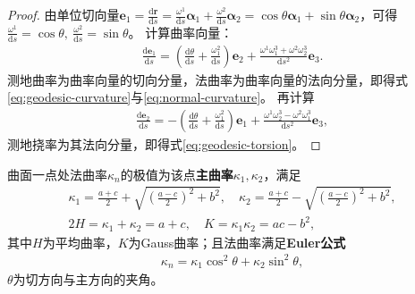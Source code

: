 \documentclass[../../main.tex]{subfiles}%
\begin{document}
\begin{proof}

由单位切向量$\boldsymbol{e}_1=\frac{\mathrm{d}\boldsymbol{r}}{\mathrm{d}s}=\frac{\omega^1}{\mathrm{d}s}\boldsymbol{\alpha}_1+\frac{\omega^2}{\mathrm{d}s}\boldsymbol{\alpha}_2=\cos\theta\boldsymbol{\alpha}_1+\sin\theta\boldsymbol{\alpha}_2$，可得$\frac{\omega^1}{\mathrm{d}s}=\cos\theta,\ \frac{\omega^2}{\mathrm{d}s}=\sin\theta$。
计算曲率向量：
\begin{align*}
\frac{\mathrm{d}\boldsymbol{e}_1}{\mathrm{d}s}=\left(\frac{\mathrm{d}\theta}{\mathrm{d}s}+\frac{\omega_1^2}{\mathrm{d}s}\right)\boldsymbol{e}_2+\frac{\omega^1\omega_1^3+\omega^2\omega_2^3}{\mathrm{d}s^2}\boldsymbol{e}_3.
\end{align*}
测地曲率为曲率向量的切向分量，法曲率为曲率向量的法向分量，即得式\eqref{eq:geodesic-curvature}与\eqref{eq:normal-curvature}。
再计算
\begin{align*}
\frac{\mathrm{d}\boldsymbol{e}_2}{\mathrm{d}s}=-\left(\frac{\mathrm{d}\theta}{\mathrm{d}s}+\frac{\omega_1^2}{\mathrm{d}s}\right)\boldsymbol{e}_1+\frac{\omega^1\omega_2^3-\omega^2\omega_1^3}{\mathrm{d}s^2}\boldsymbol{e}_3,
\end{align*}
测地挠率为其法向分量，即得式\eqref{eq:geodesic-torsion}。

\end{proof}

\begin{theorem}
曲面一点处法曲率$\kappa_n$的极值为该点\textbf{主曲率}$\kappa_1,\kappa_2$，满足
\begin{align}
\kappa_1=\frac{a+c}{2}+\sqrt{\left(\frac{a-c}{2}\right)^2+b^2},\quad \kappa_2=\frac{a+c}{2}-\sqrt{\left(\frac{a-c}{2}\right)^2+b^2},\label{eq:principal-curvature}\\
2H=\kappa_1+\kappa_2=a+c,\quad K=\kappa_1\kappa_2=ac-b^2,\label{eq:mean-gauss-curvature}
\end{align}
其中$H$为平均曲率，$K$为Gauss曲率；且法曲率满足\textbf{Euler公式}
\begin{align}
\kappa_n=\kappa_1\cos^2\theta+\kappa_2\sin^2\theta,\label{eq:euler-formula}
\end{align}
$\theta$为切方向与主方向的夹角。
\end{theorem}
\end{document}

